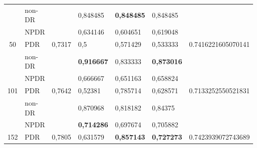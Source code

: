\begin{table}[hbtp]
\begin{center}
\begin{tabular}{|c|l|c|l|l|l|c|}
			& non-DR                                             &                          & 0,848485                                          & \textbf{0,848485}                                & 0,848485                                        &                                      \\ \cline{2-2} \cline{4-6}
			& NPDR                                               &                          & 0,634146                                          & 0,604651                                         & 0,619048                                        &                                      \\ \cline{2-2} \cline{4-6}
			\multirow{-3}{*}{50}  & PDR                                                & \multirow{-3}{*}{0,7317} & 0,5                                               & 0,571429                                         & 0,533333                                        & \multirow{-3}{*}{0.7416221605070141} \\ \hline
			& non-DR                                             &                          & \textbf{0,916667}                                 & 0,833333                                         & \textbf{0,873016}                               &                                      \\ \cline{2-2} \cline{4-6}
			& NPDR                                               &                          & 0,666667                                          & 0,651163                                         & 0,658824                                        &                                      \\ \cline{2-2} \cline{4-6}
			\multirow{-3}{*}{101} & PDR                                                & \multirow{-3}{*}{0,7642} & 0,52381                                           & 0,785714                                         & 0,628571                                        & \multirow{-3}{*}{0.7133252550521831} \\ \hline
			& non-DR                                             &                          & 0,870968                                          & 0,818182                                         & 0,84375                                         &                                      \\ \cline{2-2} \cline{4-6}
			& NPDR                                               &                          & \textbf{0,714286}                                 & 0,697674                                         & 0,705882                                        &                                      \\ \cline{2-2} \cline{4-6}
			\multirow{-3}{*}{152} & PDR                                                & \multirow{-3}{*}{0,7805} & 0,631579                                          & \textbf{0,857143}                                & \textbf{0,727273}                               & \multirow{-3}{*}{0.7423939072743689} \\ \hline
		\end{tabular}
	\end{center}
\end{table}

